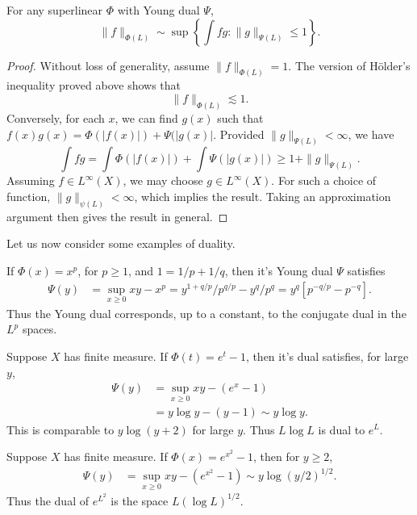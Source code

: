 \begin{theorem}
  For any superlinear $\Phi$ with Young dual $\Psi$,
  \[ \| f \|_{\Phi(L)} \sim \sup \left\{ \int fg : \| g \|_{\Psi(L)} \leq 1 \right\}. \]
\end{theorem}
\begin{proof}
  Without loss of generality, assume $\| f \|_{\Phi(L)} = 1$. The version of H\"{o}lder's inequality proved above shows that
  \[ \| f \|_{\Phi(L)} \lesssim 1. \]
  Conversely, for each $x$, we can find $g(x)$ such that $f(x) g(x) = \Phi(|f(x)|) + \Psi(|g(x)|$. Provided $\| g \|_{\Psi(L)} < \infty$, we have
  \[ \int fg = \int \Phi(|f(x)|) + \int \Psi(|g(x)|) \geq 1 + \| g \|_{\Psi(L)}. \]
  Assuming $f \in L^\infty(X)$, we may choose $g \in L^\infty(X)$. For such a choice of function, $\| g \|_{\psi(L)} < \infty$, which implies the result. Taking an approximation argument then gives the result in general.
\end{proof}

Let us now consider some examples of duality.

\begin{example}
  If $\Phi(x) = x^p$, for $p \geq 1$, and $1 = 1/p + 1/q$, then it's Young dual $\Psi$ satisfies
  \begin{align*}
    \Psi(y) &= \sup_{x \geq 0} xy - x^p = y^{1 + q/p} / p^{q/p} - y^q / p^q = y^q [p^{-q/p} - p^{-q}].
  \end{align*}
  Thus the Young dual corresponds, up to a constant, to the conjugate dual in the $L^p$ spaces.
\end{example}

\begin{example}
  Suppose $X$ has finite measure. If $\Phi(t) = e^t - 1$, then it's dual satisfies, for large $y$,
  \begin{align*}
    \Psi(y) &= \sup_{x \geq 0} xy - (e^x - 1)\\
    &= y \log y - (y - 1) \sim y \log y.
  \end{align*}
  This is comparable to $y \log (y + 2)$ for large $y$. Thus $L \log L$ is dual to $e^L$.
\end{example}

\begin{example}
  Suppose $X$ has finite measure. If $\Phi(x) = e^{x^2} - 1$, then for $y \geq 2$,
  \begin{align*}
    \Psi(y) &= \sup_{x \geq 0} xy - (e^{x^2} - 1) \sim y \log(y/2)^{1/2}.
  \end{align*}
  Thus the dual of $e^{L^2}$ is the space $L (\log L)^{1/2}$.
\end{example}

